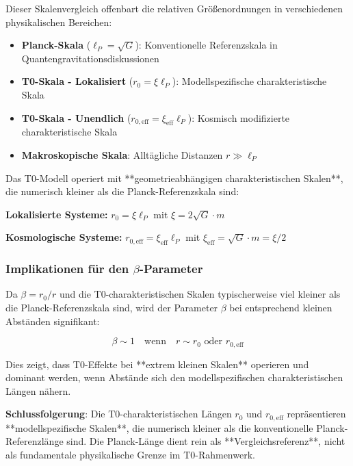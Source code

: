 \documentclass[12pt,a4paper]{article}
\begin{document}
Dieser Skalenvergleich offenbart die relativen Größenordnungen in verschiedenen physikalischen Bereichen:

\begin{itemize}
	\item \textbf{Planck-Skala} ($\ell_P = \sqrt{G}$): Konventionelle Referenzskala in Quantengravitationsdiskussionen
	\item \textbf{T0-Skala - Lokalisiert} ($r_0 = \xi \ell_P$): Modellspezifische charakteristische Skala 
	\item \textbf{T0-Skala - Unendlich} ($r_{0,\text{eff}} = \xi_{\text{eff}} \ell_P$): Kosmisch modifizierte charakteristische Skala
	\item \textbf{Makroskopische Skala}: Alltägliche Distanzen $r \gg \ell_P$
\end{itemize}

Das T0-Modell operiert mit **geometrieabhängigen charakteristischen Skalen**, die numerisch kleiner als die Planck-Referenzskala sind:

\textbf{Lokalisierte Systeme:} $r_0 = \xi \ell_P$ mit $\xi = 2\sqrt{G} \cdot m$

\textbf{Kosmologische Systeme:} $r_{0,\text{eff}} = \xi_{\text{eff}} \ell_P$ mit $\xi_{\text{eff}} = \sqrt{G} \cdot m = \xi/2$

\subsubsection{Implikationen für den $\beta$-Parameter}
\label{subsubsec:beta_implications}

Da $\beta = r_0/r$ und die T0-charakteristischen Skalen typischerweise viel kleiner als die Planck-Referenzskala sind, wird der Parameter $\beta$ bei entsprechend kleinen Abständen signifikant:

\begin{equation}
	\beta \sim 1 \quad \text{wenn} \quad r \sim r_0 \text{ oder } r_{0,\text{eff}}
\end{equation}

Dies zeigt, dass T0-Effekte bei **extrem kleinen Skalen** operieren und dominant werden, wenn Abstände sich den modellspezifischen charakteristischen Längen nähern.

\textbf{Schlussfolgerung}: Die T0-charakteristischen Längen $r_0$ und $r_{0,\text{eff}}$ repräsentieren **modellspezifische Skalen**, die numerisch kleiner als die konventionelle Planck-Referenzlänge sind. Die Planck-Länge dient rein als **Vergleichsreferenz**, nicht als fundamentale physikalische Grenze im T0-Rahmenwerk.
\end{document}
